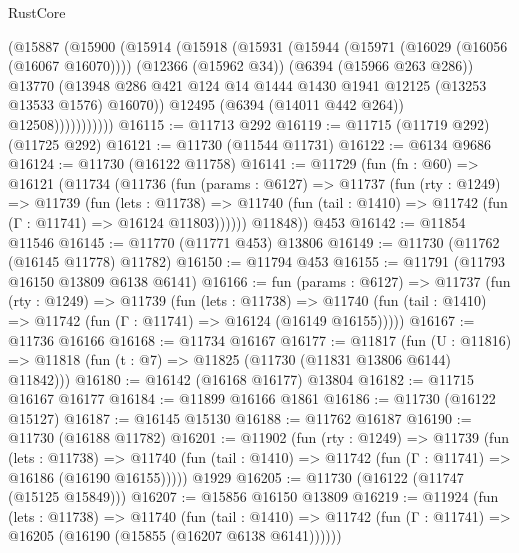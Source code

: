 \begin{lexlean}{RustCore}
\begin{coremodule}
                (@15887
                  (@15900
                    (@15914
                      (@15918
                        (@15931
                          (@15944
                            (@15971 (@16029 (@16056 (@16067 @16070))))
                            (@12366 (@15962 @34))
                            (@6394 (@15966 @263 @286))
                            @13770
                            (@13948
                              @286
                              @421
                              @124
                              @14
                              @1444
                              @1430
                              @1941
                              @12125
                              (@13253 @13533 @1576)
                              @16070))
                          @12495
                          (@6394 (@14011 @442 @264))
                          @12508)))))))))))
@16115 := @11713 @292
@16119 := @11715 (@11719 @292) (@11725 @292)
@16121 := @11730 (@11544 @11731)
@16122 := @6134 @9686
@16124 := @11730 (@16122 @11758)
@16141 := @11729
    (fun (fn : @60) =>
    @16121
      (@11734
        (@11736
          (fun (params : @6127) =>
          @11737
            (fun (rty : @1249) =>
            @11739
              (fun (lets : @11738) =>
              @11740 (fun (tail : @1410) => @11742 (fun (Γ : @11741) => @16124 @11803))))))
        @11848))
    @453
@16142 := @11854 @11546
@16145 := @11770 (@11771 @453) @13806
@16149 := @11730 (@11762 (@16145 @11778) @11782)
@16150 := @11794 @453
@16155 := @11791 (@11793 @16150 @13809 @6138 @6141)
@16166 := fun (params : @6127) =>
  @11737
    (fun (rty : @1249) =>
    @11739
      (fun (lets : @11738) =>
      @11740 (fun (tail : @1410) => @11742 (fun (Γ : @11741) => @16124 (@16149 @16155)))))
@16167 := @11736 @16166
@16168 := @11734 @16167
@16177 := @11817
    (fun (U : @11816) => @11818 (fun (t : @7) => @11825 (@11730 (@11831 @13806 @6144) @11842)))
@16180 := @16142 (@16168 @16177) @13804
@16182 := @11715 @16167 @16177
@16184 := @11899 @16166 @1861
@16186 := @11730 (@16122 @15127)
@16187 := @16145 @15130
@16188 := @11762 @16187
@16190 := @11730 (@16188 @11782)
@16201 := @11902
    (fun (rty : @1249) =>
    @11739
      (fun (lets : @11738) =>
      @11740 (fun (tail : @1410) => @11742 (fun (Γ : @11741) => @16186 (@16190 @16155)))))
    @1929
@16205 := @11730 (@16122 (@11747 (@15125 @15849)))
@16207 := @15856 @16150 @13809
@16219 := @11924
    (fun (lets : @11738) =>
    @11740
      (fun (tail : @1410) =>
      @11742 (fun (Γ : @11741) => @16205 (@16190 (@15855 (@16207 @6138 @6141))))))

\end{coremodule}
\end{lexlean}
